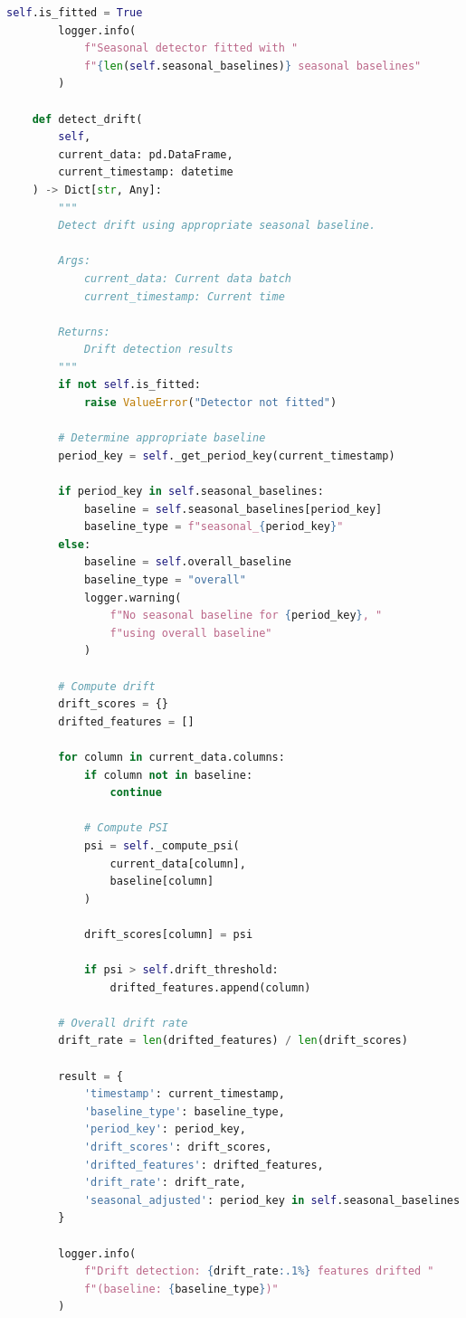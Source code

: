 \begin{lstlisting}[language=Python, caption={Seasonal-Aware Drift Detection}]
        self.is_fitted = True
        logger.info(
            f"Seasonal detector fitted with "
            f"{len(self.seasonal_baselines)} seasonal baselines"
        )

    def detect_drift(
        self,
        current_data: pd.DataFrame,
        current_timestamp: datetime
    ) -> Dict[str, Any]:
        """
        Detect drift using appropriate seasonal baseline.

        Args:
            current_data: Current data batch
            current_timestamp: Current time

        Returns:
            Drift detection results
        """
        if not self.is_fitted:
            raise ValueError("Detector not fitted")

        # Determine appropriate baseline
        period_key = self._get_period_key(current_timestamp)

        if period_key in self.seasonal_baselines:
            baseline = self.seasonal_baselines[period_key]
            baseline_type = f"seasonal_{period_key}"
        else:
            baseline = self.overall_baseline
            baseline_type = "overall"
            logger.warning(
                f"No seasonal baseline for {period_key}, "
                f"using overall baseline"
            )

        # Compute drift
        drift_scores = {}
        drifted_features = []

        for column in current_data.columns:
            if column not in baseline:
                continue

            # Compute PSI
            psi = self._compute_psi(
                current_data[column],
                baseline[column]
            )

            drift_scores[column] = psi

            if psi > self.drift_threshold:
                drifted_features.append(column)

        # Overall drift rate
        drift_rate = len(drifted_features) / len(drift_scores)

        result = {
            'timestamp': current_timestamp,
            'baseline_type': baseline_type,
            'period_key': period_key,
            'drift_scores': drift_scores,
            'drifted_features': drifted_features,
            'drift_rate': drift_rate,
            'seasonal_adjusted': period_key in self.seasonal_baselines
        }

        logger.info(
            f"Drift detection: {drift_rate:.1%} features drifted "
            f"(baseline: {baseline_type})"
        )


\end{lstlisting}

